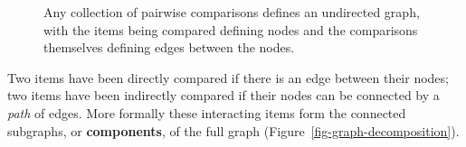 \documentclass[
  letterpaper,
  DIV=11,
  numbers=noendperiod]{scrartcl}
\begin{document}
\begin{figure}


\caption{\label{fig-graph}Any collection of pairwise comparisons defines
an undirected graph, with the items being compared defining nodes and
the comparisons themselves defining edges between the nodes.}

\end{figure}%

Two items have been directly compared if there is an edge between their
nodes; two items have been indirectly compared if their nodes can be
connected by a \emph{path} of edges. More formally these interacting
items form the connected subgraphs, or \textbf{components}, of the full
graph (Figure~\ref{fig-graph-decomposition}).
\end{document}
